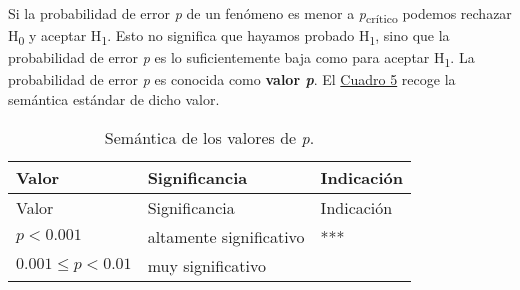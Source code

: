 \documentclass[12pt,spanish,a4paper,]{article}
\begin{document}
Si la probabilidad de error \emph{p} de un fenómeno es menor a
\emph{p}\textsubscript{crítico} podemos rechazar H\textsubscript{0} y
aceptar H\textsubscript{1}. Esto no significa que hayamos probado
H\textsubscript{1}, sino que la probabilidad de error \emph{p} es lo
suficientemente baja como para aceptar H\textsubscript{1}. La
probabilidad de error \emph{p} es conocida como \textbf{valor \emph{p}}.
El \protect\hyperlink{p}{Cuadro 5} recoge la semántica estándar de dicho
valor.

\hypertarget{p}{}

\begin{longtable}[]{@{}lll@{}}
\caption{Semántica de los valores de \emph{p}.}\tabularnewline
\toprule
\begin{minipage}[b]{0.30\columnwidth}\raggedright
Valor\strut
\end{minipage} & \begin{minipage}[b]{0.38\columnwidth}\raggedright
Significancia\strut
\end{minipage} & \begin{minipage}[b]{0.16\columnwidth}\raggedright
Indicación\strut
\end{minipage}\tabularnewline
\midrule
\endfirsthead
\toprule
\begin{minipage}[b]{0.30\columnwidth}\raggedright
Valor\strut
\end{minipage} & \begin{minipage}[b]{0.38\columnwidth}\raggedright
Significancia\strut
\end{minipage} & \begin{minipage}[b]{0.16\columnwidth}\raggedright
Indicación\strut
\end{minipage}\tabularnewline
\midrule
\endhead
\begin{minipage}[t]{0.30\columnwidth}\raggedright
\(p < 0.001\)\strut
\end{minipage} & \begin{minipage}[t]{0.38\columnwidth}\raggedright
altamente significativo\strut
\end{minipage} & \begin{minipage}[t]{0.16\columnwidth}\raggedright
***\strut
\end{minipage}\tabularnewline
\begin{minipage}[t]{0.30\columnwidth}\raggedright
\(0.001 \leq p < 0.01\)\strut
\end{minipage} & \begin{minipage}[t]{0.38\columnwidth}\raggedright
muy significativo\strut
\end{minipage} & \begin{minipage}[t]{0.16\columnwidth}\raggedright

\end{minipage}
\end{longtable}
\end{document}
